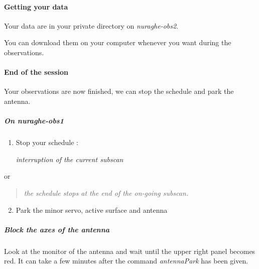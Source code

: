 \documentclass[letterpaper,10pt,english]{sphinxmanual}
\begin{document}
\paragraph{Getting your data}
\label{Continuum/L-band/TP/get-data:getting-your-data}\label{Continuum/L-band/TP/get-data::doc}
Your data are in your private directory on \emph{nuraghe-obs2}.

You can download them on your computer whenever you want during the observations.
\begin{quote}

\end{quote}


\paragraph{End of the session}
\label{Continuum/L-band/TP/stop-session:end-of-the-session}\label{Continuum/L-band/TP/stop-session::doc}
Your observations are now finished, we can stop the schedule and park
the antenna.


\subparagraph{On nuraghe-obs1}
\label{Continuum/L-band/TP/stop-session:on-nuraghe-obs1}\begin{enumerate}
\item {} 
Stop your schedule :

   \emph{interruption of the current subscan}

\end{enumerate}

or
\begin{quote}

    \emph{the schedule stops at the end of the on-going subscan.}
\end{quote}
\begin{enumerate}
\setcounter{enumi}{1}
\item {} 
Park the minor servo, active surface and antenna





\end{enumerate}


\subparagraph{Block the axes of the antenna}
\label{Continuum/L-band/TP/stop-session:block-the-axes-of-the-antenna}
Look at the monitor of the antenna and wait until the upper right
panel becomes red. It can take a few minutes after the command
\emph{antennaPark} has been given.
\end{document}
